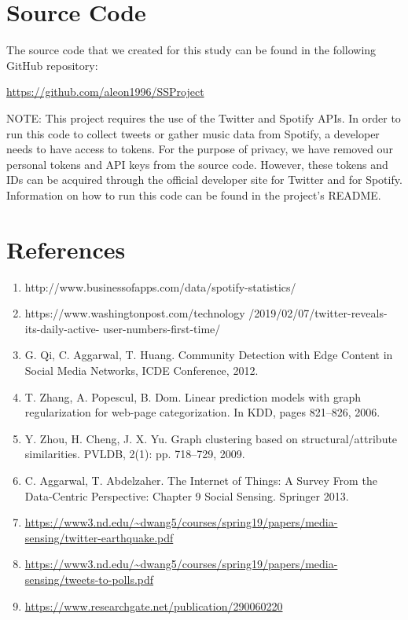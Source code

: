 \documentclass[12pt,conference]{IEEEtran}
\begin{document}
\section{Source Code}
The source code that we created for this study can be found in the following GitHub repository:
\begin{center}
\url{https://github.com/aleon1996/SSProject}
\end{center}
NOTE: This project requires the use of the Twitter and Spotify APIs. In order to run this code to collect tweets or gather music data from Spotify, a developer needs to have access to tokens. For the purpose of privacy, we have removed our personal tokens and API keys from the source code. However, these tokens and IDs can be acquired through the official developer site for Twitter and for Spotify. Information on how to run this code can be found in the project's README.\par


\section{References}
\begin{enumerate}
    \item http://www.businessofapps.com/data/spotify-statistics/
    \item https://www.washingtonpost.com/technology
    /2019/02/07/twitter-reveals-its-daily-active-
    user-numbers-first-time/
    \item G. Qi, C. Aggarwal, T. Huang. Community Detection with Edge Content in Social Media Networks, ICDE Conference, 2012.
    \item T. Zhang, A. Popescul, B. Dom. Linear prediction models with graph regularization for web-page categorization. In KDD, pages 821–826, 2006.
    \item Y. Zhou, H. Cheng, J. X. Yu. Graph clustering based on structural/attribute similarities. PVLDB, 2(1): pp. 718–729, 2009.
    \item C. Aggarwal, T. Abdelzaher. The Internet of Things: A Survey From the Data-Centric Perspective: Chapter 9 Social Sensing. Springer 2013.
    \item \url{https://www3.nd.edu/~dwang5/courses/spring19/papers/media-sensing/twitter-earthquake.pdf}
    \item \url{https://www3.nd.edu/~dwang5/courses/spring19/papers/media-sensing/tweets-to-polls.pdf}
    \item \url{https://www.researchgate.net/publication/290060220}

\end{enumerate}
\end{document}
